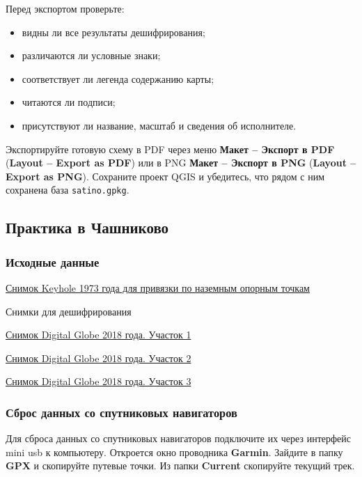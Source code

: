 \documentclass[
  russian,
  letterpaper,
  DIV=11,
  numbers=noendperiod]{scrreprt}
\providecommand{\tightlist}{%
  \setlength{\itemsep}{0pt}\setlength{\parskip}{0pt}}
\begin{document}
Перед экспортом проверьте:

\begin{itemize}
\tightlist
\item
  видны ли все результаты дешифрирования;
\item
  различаются ли условные знаки;
\item
  соответствует ли легенда содержанию карты;
\item
  читаются ли подписи;
\item
  присутствуют ли название, масштаб и сведения об исполнителе.
\end{itemize}

Экспортируйте готовую схему в PDF через меню \textbf{Макет -- Экспорт в
PDF} (\textbf{Layout -- Export as PDF}) или в PNG \textbf{Макет --
Экспорт в PNG} (\textbf{Layout -- Export as PNG}). Сохраните проект QGIS
и убедитесь, что рядом с ним сохранена база \texttt{satino.gpkg}.

\subsection{Практика в
Чашниково}\label{practice-georeference-chashnikovo}

\subsubsection{Исходные данные}\label{practice-georeference-data}

\href{https://disk.yandex.ru/i/7a93zQEgNnI4dA}{Снимок Keyhole 1973 года
для привязки по наземным опорным точкам}

Снимки для дешифрирования

\href{https://disk.yandex.ru/i/bIn38XOCT92FXA}{Снимок Digital Globe 2018
года. Участок 1}

\href{https://disk.yandex.ru/i/_VykXwJloU-0yA}{Снимок Digital Globe 2018
года. Участок 2}

\href{https://disk.yandex.ru/i/D0-eTUvb3eX_1w}{Снимок Digital Globe 2018
года. Участок 3}

\subsubsection{Сброс данных со спутниковых
навигаторов}\label{practice-georeference-gpx}

Для сброса данных со спутниковых навигаторов подключите их через
интерфейс mini usb к компьютеру. Откроется окно проводника
\textbf{Garmin}. Зайдите в папку \textbf{GPX} и скопируйте путевые
точки. Из папки \textbf{Current} скопируйте текущий трек.
\end{document}
